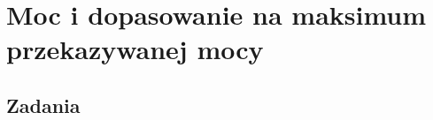 \chapter{Moc i dopasowanie na maksimum przekazywanej mocy}

\section{Zadania}




































